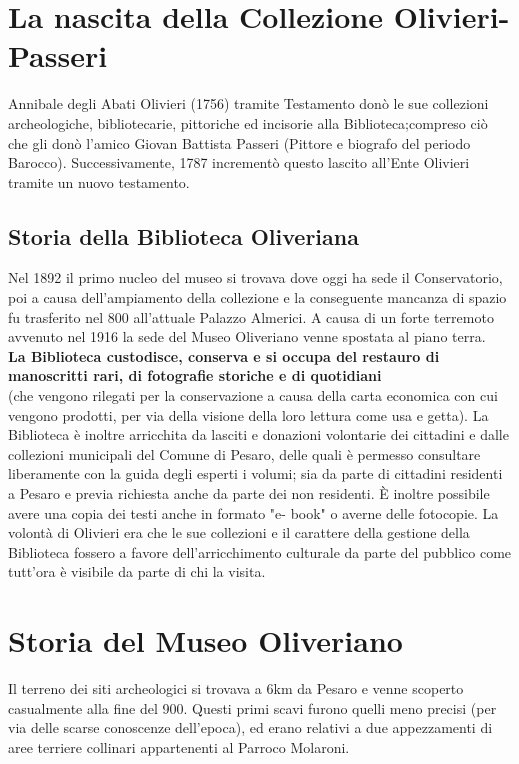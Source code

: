 \documentclass[hidelinks,12pt,a4paper]{article}
\begin{document}
\begin{flushleft}
	    \section{La nascita della Collezione Olivieri-Passeri}
	    Annibale degli Abati Olivieri (1756) tramite Testamento donò le sue collezioni archeologiche, bibliotecarie, pittoriche ed incisorie alla Biblioteca;compreso ciò che gli donò l’amico Giovan Battista Passeri (Pittore e biografo del periodo Barocco). Successivamente, 1787 incrementò questo lascito all'Ente Olivieri tramite un nuovo testamento.
		
		\subsection{Storia della Biblioteca Oliveriana}
		
		Nel 1892 il primo nucleo del museo si trovava dove oggi ha sede il Conservatorio, poi a causa dell'ampiamento della collezione e la conseguente mancanza di spazio fu trasferito nel 800 all'attuale Palazzo Almerici.
		 A causa di un forte terremoto avvenuto nel 1916 la sede del Museo Oliveriano venne spostata al piano terra.
		\\ \textbf{La Biblioteca custodisce, conserva e si occupa del restauro di manoscritti rari, di fotografie storiche e di quotidiani}\\ (che vengono rilegati per la conservazione a causa della carta economica con cui vengono prodotti, per via della visione della loro lettura come usa e getta).
		La Biblioteca è inoltre arricchita da lasciti e donazioni volontarie dei cittadini e dalle collezioni municipali del Comune di Pesaro, delle quali è permesso consultare liberamente con la guida degli esperti i volumi; sia da parte di cittadini residenti a Pesaro e previa richiesta anche da parte dei non residenti.
		È inoltre possibile avere una copia dei testi anche in formato "e- book" o averne delle fotocopie.
		La volontà di Olivieri era che le sue collezioni e il carattere della gestione della Biblioteca fossero a favore dell'arricchimento culturale da parte del pubblico come tutt'ora è visibile da parte di chi la visita.
		

		
		\section{Storia del Museo Oliveriano}
		 Il terreno dei siti archeologici si trovava a 6km da Pesaro e venne scoperto casualmente alla fine del 900.
		 Questi primi scavi furono quelli meno precisi (per via delle scarse conoscenze dell'epoca), ed erano relativi a due appezzamenti di aree terriere collinari appartenenti al Parroco Molaroni.
		 

\end{flushleft}
\end{document}

